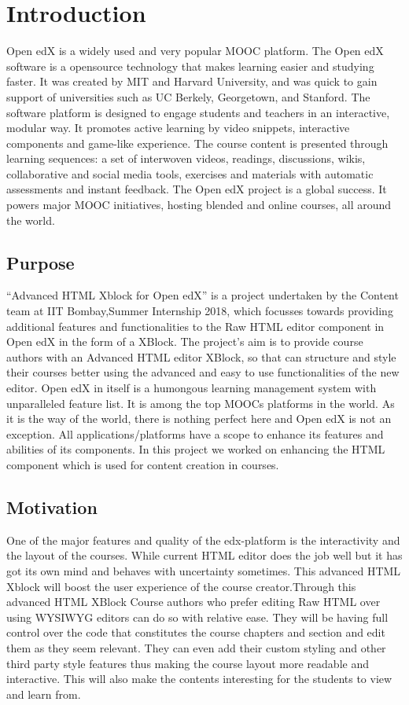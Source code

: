 \chapter{Introduction}

Open edX is a widely used and very popular MOOC platform. The Open edX software is a opensource
technology that makes learning easier and studying faster. It was created by MIT and
Harvard University, and was quick to gain support of universities such as UC Berkely, Georgetown,
and Stanford.\newline
The software platform is designed to engage students and teachers in an interactive, modular way. It
promotes active learning by video snippets, interactive components and game-like experience. The
course content is presented through learning sequences: a set of interwoven videos, readings,
discussions, wikis, collaborative and social media tools, exercises and materials with automatic
assessments and instant feedback.\newline
The Open edX project is a global success. It powers major MOOC initiatives, hosting blended and
online courses, all around the world.

\section{Purpose}
“Advanced HTML Xblock for Open edX” is a project undertaken by the Content team at IIT
Bombay,Summer Internship 2018, which focusses towards providing additional features and
functionalities to the Raw HTML editor component in Open edX in the form of a XBlock. The
project’s aim is to provide course authors with an Advanced HTML editor XBlock, so that can
structure and style their courses better using the advanced and easy to use functionalities of the new
editor. Open edX in itself is a humongous learning management system with unparalleled feature
list. It is among the top MOOCs platforms in the world. As it is the way of the world, there is
nothing perfect here and Open edX is not an exception. All applications/platforms have a scope to
enhance its features and abilities of its components. In this project we worked on enhancing the
HTML component which is used for content creation in courses.

\section{Motivation}
One of the major features and quality of the edx-platform is the interactivity and the layout of the
courses. While current HTML editor does the job well but it has got its own mind and behaves with
uncertainty sometimes. This advanced HTML Xblock will boost the user experience of the course
creator.Through this advanced HTML XBlock Course authors who prefer editing Raw HTML over
using WYSIWYG editors can do so with relative ease. They will be having full control over the
code that constitutes the course chapters and section and edit them as they seem relevant. They can
even add their custom styling and other third party style features thus making the course layout
more readable and interactive. This will also make the contents interesting for the students to view
and learn from.

